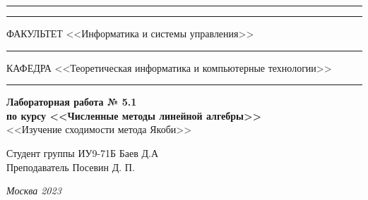 \documentclass[a4paper, 14pt]{extarticle}
\begin{document}
\begin{titlepage}
\vspace{-25pt}
\hspace{-35pt}\rule{\textwidth}{2.3pt}

\vspace*{-20.3pt}
\hspace{-35pt}\rule{\textwidth}{0.4pt}

\vspace{1.5ex}
\hspace{-35pt} \noindent \small ФАКУЛЬТЕТ\hspace{80pt} <<Информатика и системы управления>>

\vspace*{-16pt}
\hspace{47pt}\rule{0.83\textwidth}{0.4pt}

\vspace{0.5ex}
\hspace{-35pt} \noindent \small КАФЕДРА\hspace{50pt} <<Теоретическая информатика и компьютерные технологии>>

\vspace*{-16pt}
\hspace{30pt}\rule{0.866\textwidth}{0.4pt}

\vspace{11em}

\begin{center}
\Large {\bf Лабораторная работа № 5.1} \\
\large {\bf по курсу <<Численные методы линейной алгебры>>} \\
\large <<Изучение сходимости метода Якоби>>
\end{center}\normalsize

\vspace{8em}


\begin{flushright}
  {Студент группы ИУ9-71Б Баев Д.А \hspace*{15pt}\\
  \vspace{2ex}
  Преподаватель Посевин Д. П.\hspace*{15pt}}
\end{flushright}

\bigskip

\vfill


\begin{center}
\textsl{Москва 2023}
\end{center}
\end{titlepage}
\end{document}
